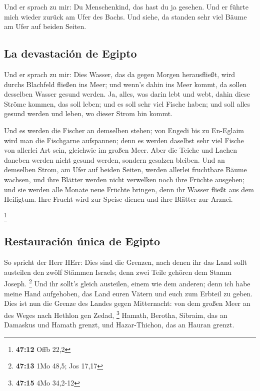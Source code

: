  Und er sprach zu mir: Du Menschenkind, das hast du ja
gesehen. Und er führte mich wieder zurück am Ufer des Bachs.
 Und siehe, da standen sehr viel Bäume am Ufer auf beiden
Seiten.

\hypertarget{la-devastaciuxf3n-de-egipto}{%
\subsection{La devastación de
Egipto}\label{la-devastaciuxf3n-de-egipto}}

 Und er sprach zu mir: Dies Wasser, das da gegen Morgen
herausfließt, wird durchs Blachfeld fließen ins Meer; und wenn's dahin
ins Meer kommt, da sollen desselben Wasser gesund werden. 
Ja, alles, was darin lebt und webt, dahin diese Ströme kommen, das soll
leben; und es soll sehr viel Fische haben; und soll alles gesund werden
und leben, wo dieser Strom hin kommt.

 Und es werden die Fischer an demselben stehen; von
Engedi bis zu En-Eglaim wird man die Fischgarne aufspannen; denn es
werden daselbst sehr viel Fische von allerlei Art sein, gleichwie im
großen Meer.  Aber die Teiche und Lachen daneben werden
nicht gesund werden, sondern gesalzen bleiben.  Und an
demselben Strom, am Ufer auf beiden Seiten, werden allerlei fruchtbare
Bäume wachsen, und ihre Blätter werden nicht verwelken noch ihre Früchte
ausgehen; und sie werden alle Monate neue Früchte bringen, denn ihr
Wasser fließt aus dem Heiligtum. Ihre Frucht wird zur Speise dienen und
ihre Blätter zur Arznei.

\footnote{\textbf{47:12} Offb 22,2}

\hypertarget{restauraciuxf3n-uxfanica-de-egipto}{%
\subsection{Restauración única de
Egipto}\label{restauraciuxf3n-uxfanica-de-egipto}}

 So spricht der Herr HErr: Dies sind die Grenzen, nach
denen ihr das Land sollt austeilen den zwölf Stämmen Israels; denn zwei
Teile gehören dem Stamm Joseph. \footnote{\textbf{47:13} 1Mo 48,5; Jos
  17,17}  Und ihr sollt's gleich austeilen, einem wie dem
anderen; denn ich habe meine Hand aufgehoben, das Land euren Vätern und
euch zum Erbteil zu geben.  Dies ist nun die Grenze des
Landes gegen Mitternacht: von dem großen Meer an des Weges nach Hethlon
gen Zedad, \footnote{\textbf{47:15} 4Mo 34,2-12}  Hamath,
Berotha, Sibraim, das an Damaskus und Hamath grenzt, und Hazar-Thichon,
das an Hauran grenzt.

